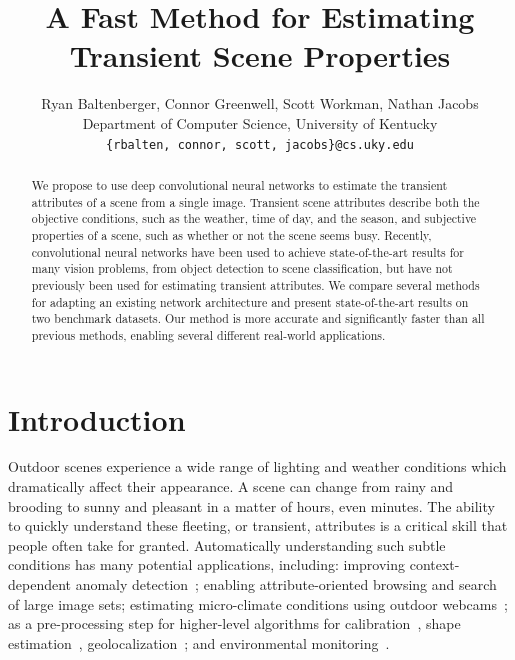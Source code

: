 \documentclass[10pt,twocolumn,letterpaper]{article}
\begin{document}
\title{A Fast Method for Estimating Transient Scene Properties}


\author{Ryan Baltenberger, Connor Greenwell, Scott Workman, Nathan Jacobs \\
  \vspace{-.75em} 
  Department of Computer Science, University of Kentucky \\
  {\tt\small \{rbalten, connor, scott, jacobs\}@cs.uky.edu}
}

\maketitle
\ifwacvfinal\thispagestyle{empty}\fi


\begin{abstract}

We propose to use deep convolutional neural networks to estimate the
transient attributes of a scene from a single image.  Transient scene
attributes describe both the objective conditions, such as the
weather, time of day, and the season, and subjective properties of a
scene, such as whether or not the scene seems busy. Recently,
convolutional neural networks have been used to achieve
state-of-the-art results for many vision problems, from object
detection to scene classification, but have not previously been used
for estimating transient attributes. We compare several methods for
adapting an existing network architecture and present state-of-the-art
results on two benchmark datasets. Our method is more accurate and
significantly faster than all previous methods, enabling several different
real-world applications. 

\end{abstract}

\section{Introduction}
\indent
Outdoor scenes experience a wide range of lighting and weather conditions which
dramatically affect their appearance. A scene can change from rainy and
brooding to sunny and pleasant in a matter of hours, even minutes. The ability
to quickly understand these fleeting, or transient, attributes is a critical
skill that people often take for granted. Automatically understanding such
subtle conditions has many potential applications, including: improving
context-dependent anomaly detection~\cite{abrams12lost}; enabling
attribute-oriented browsing and search of large image
sets\cite{jacobs07amos,skyfinder}; estimating micro-climate conditions using
outdoor webcams~\cite{islam13webcamweather}; as a pre-processing step for
higher-level algorithms for
calibration~\cite{jacobs13cloudcalibration,workman2014rainbow}, shape
estimation~\cite{heliometric,abramsheliometric},
geolocalization~\cite{jacobs07geolocate}; and  environmental
monitoring~\cite{jacobs09webcamgis}. 
\end{document}
